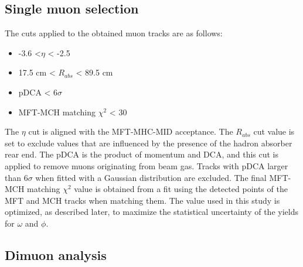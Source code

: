     \subsection{Single muon selection}
    \label{Single_muon_selection}
        The cuts applied to the obtained muon tracks are as follows:
        \begin{itemize}{}
            \item -3.6 <$\eta$ < -2.5
            \item 17.5 cm < $R_{abs}$ < 89.5 cm
            \item pDCA < 6$\sigma$
            \item MFT-MCH matching $\chi^2$ < 30
        \end{itemize}
        The $\eta$ cut is aligned with the MFT-MHC-MID acceptance. The $R_{abs}$ cut value is set to exclude values that are influenced by the presence of the hadron absorber rear end. The pDCA is the product of momentum and DCA, and this cut is applied to remove muons originating from beam gas. Tracks with pDCA larger than 6$\sigma$ when fitted with a Gaussian distribution are excluded. 
        The final MFT-MCH matching $\chi^2$ value is obtained from a fit using the detected points of the MFT and MCH tracks when matching them. The value used in this study is optimized, as described later, to maximize the statistical uncertainty of the yields for $\omega$ and $\phi$. 
    
        \subsection{Dimuon analysis}
        \label{Dimuon}

